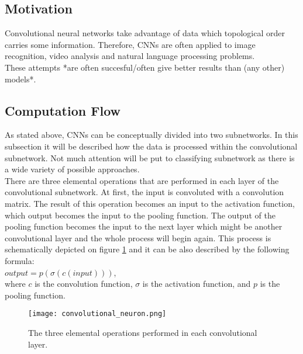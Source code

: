 \documentclass[a4paper,10pt]{report}
\begin{document}
      \subsection{Motivation} %
	Convolutional neural networks take advantage of data which topological order carries some information. Therefore, CNNs are often applied to image recognition, video analysis and natural language processing problems.\\ %
	These attempts *are often succesful/often give better results than (any other) models*.\\ %
	
      
      \subsection{Computation Flow}
	As stated above, CNNs can be conceptually divided into two subnetworks. In this subsection it will be described how the data is processed within the convolutional subnetwork. Not much attention will be put to classifying subnetwork as there is a wide variety of possible approaches.\\
	
	There are three elemental operations that are performed in each layer of the convolutional subnetwork. At first, the input is convoluted with a convolution matrix. The result of this operation becomes an input to the activation function, which output becomes the input to the pooling function. The output of the pooling function becomes the input to the next layer which might be another convolutional layer and the whole process will begin again. This process is schematically depicted on figure \ref{fig:con_neur} and it can be also described by the following formula:\\
	
	$output = p(\sigma(c(input)))$,\\
	
	where $c$ is the convolution function, $\sigma$ is the activation function, and $p$ is the pooling function.\\
	
	\begin{figure}[h!]
	  \centering
	  \texttt{[image: convolutional\_neuron.png]}
	  \caption{The three elemental operations performed in each convolutional layer.}
	  \label{fig:con_neur}
	\end{figure} 
	  
\end{document}
